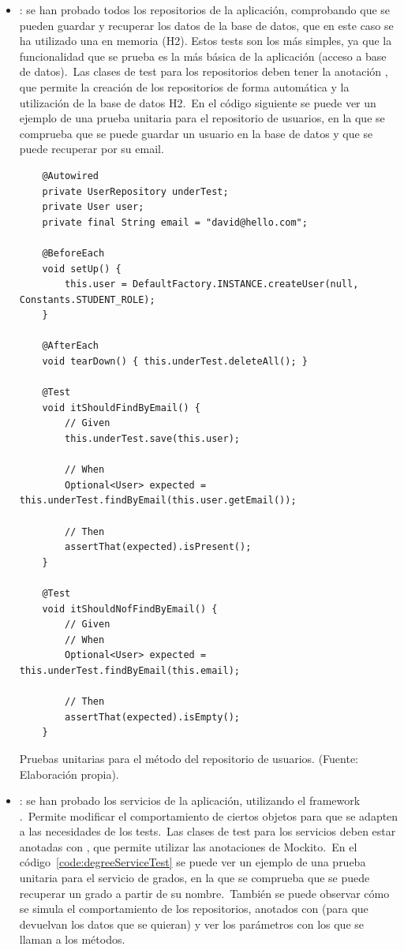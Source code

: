 \begin{itemize}
	\item {}: se han probado todos los repositorios de la aplicación, comprobando que se pueden
	guardar y recuperar los datos de la base de datos, que en este caso se ha utilizado una en memoria (H2).
	Estos tests son los más simples, ya que la funcionalidad
	que se prueba es la más básica de la aplicación (acceso a base de datos).\ Las clases de test para los
	repositorios deben tener la anotación , que permite la creación de los repositorios
	de forma automática y la utilización de la base de datos H2.\ En el código siguiente se puede
	ver un ejemplo de una prueba unitaria para el repositorio de usuarios, en la que se comprueba que se puede
	guardar un usuario en la base de datos y que se puede recuperar por su email.
	\begin{codeBlock}
		\begin{verbatim}
	@Autowired
	private UserRepository underTest;
	private User user;
	private final String email = "david@hello.com";

	@BeforeEach
	void setUp() {
		this.user = DefaultFactory.INSTANCE.createUser(null, Constants.STUDENT_ROLE);
	}

	@AfterEach
	void tearDown() { this.underTest.deleteAll(); }

	@Test
	void itShouldFindByEmail() {
		// Given
		this.underTest.save(this.user);

		// When
		Optional<User> expected = this.underTest.findByEmail(this.user.getEmail());

		// Then
		assertThat(expected).isPresent();
	}

	@Test
	void itShouldNofFindByEmail() {
		// Given
		// When
		Optional<User> expected = this.underTest.findByEmail(this.email);

		// Then
		assertThat(expected).isEmpty();
	}
		\end{verbatim}
		\caption{Pruebas unitarias para el método  del repositorio de usuarios.
			(Fuente: Elaboración propia).}
		\label{code:pruebas-unitarias-repositorio-usuarios}
	\end{codeBlock}

	\item {}: se han probado los servicios de la aplicación, utilizando el framework
	.\ Permite modificar el comportamiento de ciertos objetos para que se adapten a las necesidades
	de los tests.\ Las clases de test para los servicios deben estar anotadas con
	, que permite utilizar las anotaciones de Mockito.\ En el
	código~\ref{code:degreeServiceTest} se puede ver un ejemplo de una prueba unitaria para el servicio de grados,
	en la que se
	comprueba que se puede recuperar un grado a partir de su nombre.\ También se puede observar cómo se simula el
	comportamiento de los repositorios, anotados con  (para que devuelvan los datos que se quieran)
	y ver los parámetros con los que se llaman a los métodos.


\end{itemize}
